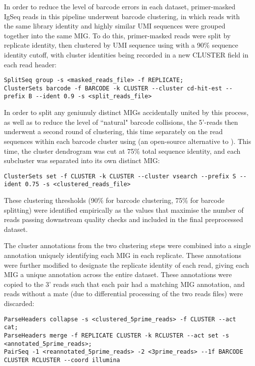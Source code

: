 In order to reduce the level of barcode errors in each dataset, primer-masked IgSeq reads in this pipeline underwent barcode clustering, in which reads with the same library identity and highly similar UMI sequences were grouped together into the same MIG. To do this, primer-masked reads were split by replicate identity, then clustered by UMI sequence using  %
with a 90\% sequence identity cutoff, with cluster identities being recorded in a new CLUSTER field in each read header:

\begin{lstlisting}
SplitSeq group -s <masked_reads_file> -f REPLICATE;
ClusterSets barcode -f BARCODE -k CLUSTER --cluster cd-hit-est --prefix B --ident 0.9 -s <split_reads_file>
\end{lstlisting}

In order to split any geniunuly distinct MIGs accidentally united by this process, as well as to reduce the level of ``natural" barcode collisions, the 5'-reads then underwent a second round of clustering, this time separately on the read sequences within each barcode cluster using  (an open-source alternative to ). %
This time, the cluster dendrogram was cut at 75\% total sequence identity, and each subcluster was separated into its own distinct MIG:

\begin{lstlisting}
ClusterSets set -f CLUSTER -k CLUSTER --cluster vsearch --prefix S --ident 0.75 -s <clustered_reads_file>
\end{lstlisting}

These clustering thresholds (90\% for barcode clustering, 75\% for barcode splitting) were identified empirically as the values that maximise the number of reads passing downstream quality checks and included in the final preprocessed dataset.

The cluster annotations from the two clustering steps were combined into a single annotation uniquely identifying each MIG in each replicate. These annotations were further modified to designate the replicate identity of each read, giving each MIG a unique annotation across the entire dataset. These annotations were copied to the 3' reads such that each pair had a matching MIG annotation, and reads without a mate (due to differential processing of the two reads files) were discarded:

\begin{lstlisting}
ParseHeaders collapse -s <clustered_5prime_reads> -f CLUSTER --act cat;
ParseHeaders merge -f REPLICATE CLUSTER -k RCLUSTER --act set -s <annotated_5prime_reads>;
PairSeq -1 <reannotated_5prime_reads> -2 <3prime_reads> --1f BARCODE CLUSTER RCLUSTER --coord illumina
\end{lstlisting}

